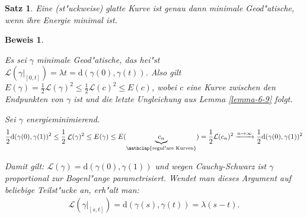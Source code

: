 \documentclass[paper=A4, twoside, chapterprefix=true, bibliography=totoc, headsepline]{scrbook}
\DeclareMathOperator{\calL}{\mathcal{L}}
\newcommand{\dop}{\mathrm{d}}
\theoremstyle{plain}
\newtheorem{Satz}[Dfn]{Satz}
\theoremstyle{nonumberplain}
\newtheorem{bew}{Beweis}
\theoremstyle{empty}
\theoremstyle{break}
\newcommand{\quot}[1]{\textrm{\glqq}{#1}\textrm{\grqq}}
\begin{document}
\begin{Satz}
  Eine (st"uckweise) glatte Kurve ist genau dann minimale Geod"atische, wenn ihre Energie minimal ist.
\end{Satz}

\begin{bew}\begin{description}[font=\normalfont]
  \item[\quot{$\Rightarrow$}:]
    Es sei $\gamma$ minimale Geod"atische, das hei"st $\mathcal L(\gamma|_{[0,t]}) = \lambda t = \dop (\gamma(0),\gamma(t))$.
    Also gilt $E(\gamma) = \frac{1}2 \mathcal L(\gamma)^2 \leq \frac{1}2 \mathcal L(c)^2 \leq E(c)$, wobei $c$ eine Kurve zwischen den Endpunkten von $\gamma$ ist und die letzte Ungleichung aus Lemma \ref{lemma-6-9} folgt.
  \item[\quot{$\Leftarrow$}:]
    Sei $\gamma$ energieminimierend.
    \begin{align*}
      \frac{1}2 \dop (\gamma(0), \gamma(1))^2 \leq \frac{1}2 \calL(\gamma)^2 \leq E(\gamma) \leq E(\underbrace{c_n}_{\mathclap{\text{regul"are Kurven}}}) = \frac{1}2 \mathcal L(c_n)^2 \xrightarrow{n\to\infty} \frac{1}2 \dop(\gamma(0),\gamma(1))^2
    \end{align*}
    \begin{center}\end{center}

	Damit gilt: $\mathcal L(\gamma) = \dop(\gamma(0),\gamma(1))$ und wegen Cauchy-Schwarz ist $\gamma$ proportional zur Bogenl"ange parametrisiert.
	Wendet man dieses Argument auf beliebige Teilst"ucke an, erh"alt man:
	\begin{align*}
		\mathcal L(\gamma|_{[s,t]}) = \dop(\gamma(s),\gamma(t)) = \lambda(s-t).
	\end{align*}
\end{description}\end{bew}
\end{document}

